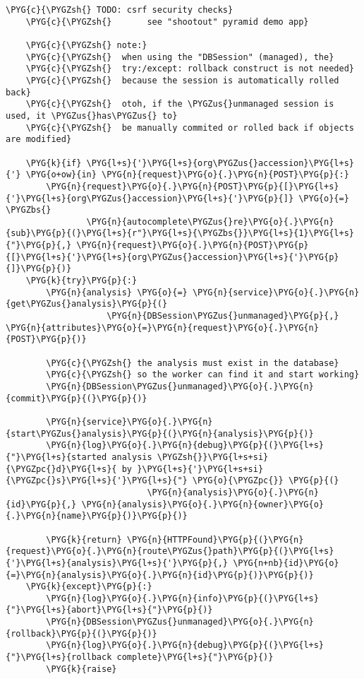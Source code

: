 \begin{Verbatim}[commandchars=\\\{\}]
    \PYG{c}{\PYGZsh{} TODO: csrf security checks}
    \PYG{c}{\PYGZsh{}       see "shootout" pyramid demo app}

    \PYG{c}{\PYGZsh{} note:}
    \PYG{c}{\PYGZsh{}  when using the "DBSession" (managed), the}
    \PYG{c}{\PYGZsh{}  try:/except: rollback construct is not needed}
    \PYG{c}{\PYGZsh{}  because the session is automatically rolled back}
    \PYG{c}{\PYGZsh{}  otoh, if the \PYGZus{}unmanaged session is used, it \PYGZus{}has\PYGZus{} to}
    \PYG{c}{\PYGZsh{}  be manually commited or rolled back if objects are modified}

    \PYG{k}{if} \PYG{l+s}{'}\PYG{l+s}{org\PYGZus{}accession}\PYG{l+s}{'} \PYG{o+ow}{in} \PYG{n}{request}\PYG{o}{.}\PYG{n}{POST}\PYG{p}{:}
        \PYG{n}{request}\PYG{o}{.}\PYG{n}{POST}\PYG{p}{[}\PYG{l+s}{'}\PYG{l+s}{org\PYGZus{}accession}\PYG{l+s}{'}\PYG{p}{]} \PYG{o}{=} \PYGZbs{}
                \PYG{n}{autocomplete\PYGZus{}re}\PYG{o}{.}\PYG{n}{sub}\PYG{p}{(}\PYG{l+s}{r"}\PYG{l+s}{\PYGZbs{}}\PYG{l+s}{1}\PYG{l+s}{"}\PYG{p}{,} \PYG{n}{request}\PYG{o}{.}\PYG{n}{POST}\PYG{p}{[}\PYG{l+s}{'}\PYG{l+s}{org\PYGZus{}accession}\PYG{l+s}{'}\PYG{p}{]}\PYG{p}{)}
    \PYG{k}{try}\PYG{p}{:}
        \PYG{n}{analysis} \PYG{o}{=} \PYG{n}{service}\PYG{o}{.}\PYG{n}{get\PYGZus{}analysis}\PYG{p}{(}
                    \PYG{n}{DBSession\PYGZus{}unmanaged}\PYG{p}{,} \PYG{n}{attributes}\PYG{o}{=}\PYG{n}{request}\PYG{o}{.}\PYG{n}{POST}\PYG{p}{)}

        \PYG{c}{\PYGZsh{} the analysis must exist in the database}
        \PYG{c}{\PYGZsh{} so the worker can find it and start working}
        \PYG{n}{DBSession\PYGZus{}unmanaged}\PYG{o}{.}\PYG{n}{commit}\PYG{p}{(}\PYG{p}{)}

        \PYG{n}{service}\PYG{o}{.}\PYG{n}{start\PYGZus{}analysis}\PYG{p}{(}\PYG{n}{analysis}\PYG{p}{)}
        \PYG{n}{log}\PYG{o}{.}\PYG{n}{debug}\PYG{p}{(}\PYG{l+s}{"}\PYG{l+s}{started analysis \PYGZsh{}}\PYG{l+s+si}{\PYGZpc{}d}\PYG{l+s}{ by }\PYG{l+s}{'}\PYG{l+s+si}{\PYGZpc{}s}\PYG{l+s}{'}\PYG{l+s}{"} \PYG{o}{\PYGZpc{}} \PYG{p}{(}
                            \PYG{n}{analysis}\PYG{o}{.}\PYG{n}{id}\PYG{p}{,} \PYG{n}{analysis}\PYG{o}{.}\PYG{n}{owner}\PYG{o}{.}\PYG{n}{name}\PYG{p}{)}\PYG{p}{)}

        \PYG{k}{return} \PYG{n}{HTTPFound}\PYG{p}{(}\PYG{n}{request}\PYG{o}{.}\PYG{n}{route\PYGZus{}path}\PYG{p}{(}\PYG{l+s}{'}\PYG{l+s}{analysis}\PYG{l+s}{'}\PYG{p}{,} \PYG{n+nb}{id}\PYG{o}{=}\PYG{n}{analysis}\PYG{o}{.}\PYG{n}{id}\PYG{p}{)}\PYG{p}{)}
    \PYG{k}{except}\PYG{p}{:}
        \PYG{n}{log}\PYG{o}{.}\PYG{n}{info}\PYG{p}{(}\PYG{l+s}{"}\PYG{l+s}{abort}\PYG{l+s}{"}\PYG{p}{)}
        \PYG{n}{DBSession\PYGZus{}unmanaged}\PYG{o}{.}\PYG{n}{rollback}\PYG{p}{(}\PYG{p}{)}
        \PYG{n}{log}\PYG{o}{.}\PYG{n}{debug}\PYG{p}{(}\PYG{l+s}{"}\PYG{l+s}{rollback complete}\PYG{l+s}{"}\PYG{p}{)}
        \PYG{k}{raise}
\end{Verbatim}


